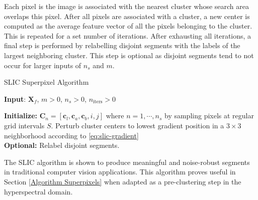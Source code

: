 Each pixel is the image is associated with the nearest cluster whose search area overlaps this pixel. After all pixels are associated with a cluster, a new center is computed as the average feature vector of all the pixels belonging to the cluster. This is repeated for a set number of iterations. After exhausting all iterations, a final step is performed by relabelling disjoint segments with the labels of the largest neighboring cluster. This step is optional as disjoint segments tend to not occur for larger inputs of $n_s$ and $m$.

\begin{algorithm}
    \caption{SLIC Superpixel Algorithm}
    
    \textbf{Input}: $\mathbf{X}_f$, $m > 0$, $n_s > 0$, $n_{\text{iters}} > 0$

    \textbf{Initialize:} $\mathbf{C}_n = [\mathbf{c}_{l}, \mathbf{c}_{a}, \mathbf{c}_{b}, i, j]$ where $n = 1, \cdots, n_s$ by sampling pixels at regular grid intervals $S$. Perturb cluster centers to lowest gradient position in a $3 \times 3$ neighborhood according to \eqref{eq:slic-gradient} \\
    
    \textbf{Optional:} Relabel disjoint segments.
\end{algorithm}

The SLIC algorithm is shown to produce meaningful and noise-robust segments in traditional computer vision applications. This algorithm proves useful in Section \ref{Algorithm Superpixels} when adapted as a pre-clustering step in the hyperspectral domain.
